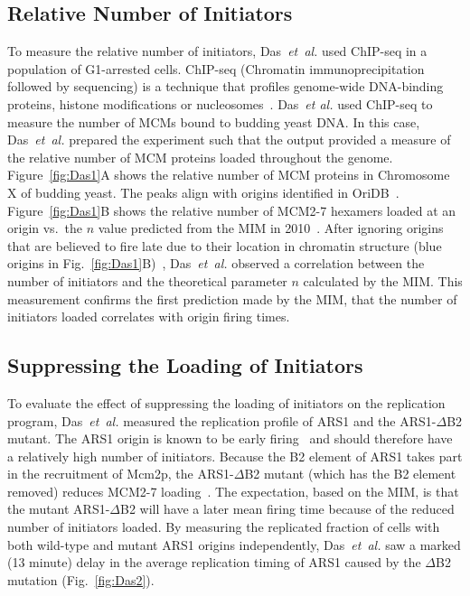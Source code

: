 {		\subsection{Relative Number of Initiators}
		\label{subsec:RelativeNo}
		
		To measure the relative number of initiators, Das~\emph{et~al.} used ChIP-seq in a population of G1-arrested cells.
		ChIP-seq (Chromatin immunoprecipitation followed by sequencing) is a technique that profiles genome-wide DNA-binding proteins, histone modifications or nucleosomes~\cite{ChIP-seq}.
		Das~\emph{et al.} used ChIP-seq to measure the number of MCMs bound to budding yeast DNA.
		In this case, Das~\emph{et~al.} prepared the experiment such that the output provided a measure of the relative number of MCM proteins loaded throughout the genome.
		Figure~\ref{fig:Das1}A shows the relative number of MCM proteins in Chromosome X of budding yeast.
		The peaks align with origins identified in OriDB~\cite{OriDB}.
		Figure~\ref{fig:Das1}B shows the relative number of MCM2-7 hexamers loaded at an origin vs.\ the $n$ value predicted from the MIM in 2010~\cite{ScottsPaper}.
		After ignoring origins that are believed to fire late due to their location in chromatin structure (blue origins in Fig.~\ref{fig:Das1}B)~\cite{Chromatin}, Das~\emph{et~al.} observed a correlation between the number of initiators and the theoretical parameter $n$ calculated by the MIM.
		This measurement confirms the first prediction made by the MIM, that the number of initiators loaded correlates with origin firing times.
		
		
		\subsection{Suppressing the Loading of Initiators}
		\label{subsec:SuppressingInitiators}
		
		To evaluate the effect of suppressing the loading of initiators on the replication program, Das~\emph{et~al.} measured the replication profile of ARS1 and the ARS1-$\Delta$B2 mutant.
		The ARS1 origin is known to be early firing~\cite{OriDB} and should therefore have a relatively high number of initiators.
		Because the B2 element of ARS1 takes part in the recruitment of Mcm2p, the ARS1-$\Delta$B2 mutant (which has the B2 element removed) reduces MCM2-7 loading~\cite{ARS1Mutant}.
		The expectation, based on the MIM, is that the mutant ARS1-$\Delta$B2 will have a later mean firing time because of the reduced number of initiators loaded.
		By measuring the replicated fraction of cells with both wild-type and mutant ARS1 origins independently, Das~\emph{et~al.} saw a marked (13 minute) delay in the average replication timing of ARS1 caused by the $\Delta$B2 mutation (Fig.~\ref{fig:Das2}).
		
}
